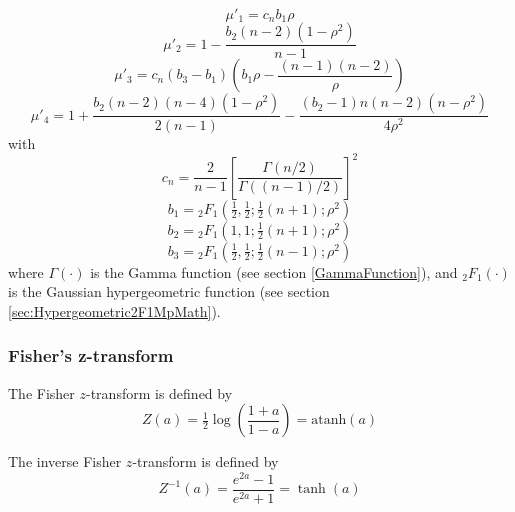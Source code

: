 \begin{equation}
	\mu'_1 = c_n b_1 \rho
\end{equation}
\begin{equation}
	\mu'_2= 1 - \frac{b_2(n-2)(1-\rho^2)}{n-1}
\end{equation}
\begin{equation}
	\mu'_3= c_n  (b_3-b_1) \left(b_1 \rho - \frac{(n-1)(n-2)}{\rho} \right)
\end{equation}
\begin{equation}
	\mu'_4=  1 + \frac{b_2(n-2)(n-4)(1-\rho^2)}{2(n-1)} - \frac{(b_2 - 1)n(n-2)(n-\rho^2)}{4\rho^2} 
\end{equation}
with
\begin{equation}
	c_n = \frac{2}{n-1} \left[\frac{\Gamma(n/2)}{\Gamma((n-1)/2)}\right]^2
\end{equation}
\begin{equation}
	b_1 = {}_2F_1\left(\tfrac{1}{2},\tfrac{1}{2};\tfrac{1}{2}(n+1);\rho^2 \right)
\end{equation}
\begin{equation}
	b_2 = {}_2F_1\left(1,1;\tfrac{1}{2}(n+1);\rho^2 \right)
\end{equation}
\begin{equation}
	b_3 = {}_2F_1\left(\tfrac{1}{2},\tfrac{1}{2};\tfrac{1}{2}(n-1);\rho^2 \right)
\end{equation}
where $\Gamma(\cdot)$ is the Gamma function (see section \ref{GammaFunction}), and ${}_2F_1(\cdot)$ is the Gaussian hypergeometric function (see section \ref{sec:Hypergeometric2F1MpMath}).


\subsubsection{Fisher's z-transform}
The Fisher $z$-transform is defined by
\begin{equation}  \label{eq:PearsonRho_zTransform}
	Z(a)=\tfrac{1}{2} \log \left(\frac{1+a}{1-a}\right) = \text{atanh}(a)
\end{equation}

The inverse Fisher $z$-transform is defined by
\begin{equation} \label{eq:PearsonRho_Inverse_zTransform}
	Z^{-1}(a) = \frac{e^{2a}-1}{e^{2a}+1} = \tanh(a)
\end{equation}




